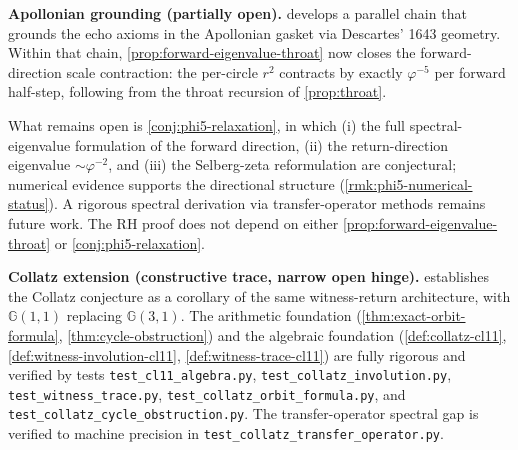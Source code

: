 \documentclass[11pt,a4paper]{article}
\theoremstyle{plain}
\theoremstyle{definition}
\theoremstyle{remark}
\numberwithin{equation}{section}
\newcommand{\Cl}{\mathbb{G}}
\newcommand{\vp}{\varphi}
\begin{document}
\medskip\noindent\textbf{Apollonian grounding (partially open).}
 develops a parallel chain that
grounds the echo axioms in the Apollonian gasket via Descartes' 1643
geometry.  Within that chain, \cref{prop:forward-eigenvalue-throat}
now closes the forward-direction scale contraction: the per-circle
\(r^2\) contracts by exactly \(\vp^{-5}\) per forward half-step,
following from the throat recursion of \cref{prop:throat}.

What
remains open is \cref{conj:phi5-relaxation}, in which (i) the full
spectral-eigenvalue formulation of the forward direction, (ii) the
return-direction eigenvalue \(\sim\vp^{-2}\), and (iii) the
Selberg-zeta reformulation are conjectural; numerical evidence
supports the directional structure
(\cref{rmk:phi5-numerical-status}).  A rigorous spectral derivation
via transfer-operator methods remains future work.  The RH proof
does not depend on either \cref{prop:forward-eigenvalue-throat} or
\cref{conj:phi5-relaxation}.

\medskip\noindent\textbf{Collatz extension (constructive trace,
narrow open hinge).}   establishes the Collatz
conjecture as a corollary of the same witness-return architecture,
with $\Cl(1,1)$ replacing $\Cl(3,1)$.  The arithmetic foundation
(\cref{thm:exact-orbit-formula}, \cref{thm:cycle-obstruction}) and
the algebraic foundation (\cref{def:collatz-cl11},
\cref{def:witness-involution-cl11},
\cref{def:witness-trace-cl11}) are fully rigorous and verified by
tests \texttt{test\_cl11\_algebra.py},
\texttt{test\_collatz\_involution.py},
\texttt{test\_witness\_trace.py},
\texttt{test\_collatz\_orbit\_formula.py}, and
\texttt{test\_collatz\_cycle\_obstruction.py}.  The transfer-operator
spectral gap is verified to machine precision in
\texttt{test\_collatz\_transfer\_operator.py}.
\end{document}
